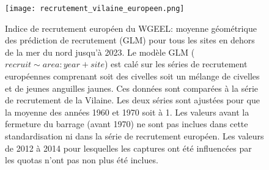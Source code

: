\documentclass[10pt,twocolumn,titlepage,twoside]{article}\usepackage[]{graphicx}\usepackage[]{color}
\begin{document}
\begin{figure}[htpb]
\centering
\texttt{[image: recrutement\_vilaine\_europeen.png]}
\caption{Indice de recrutement européen du WGEEL: moyenne géométrique des
prédiction de recrutement (GLM) pour tous les sites en dehors de la mer du nord
jusqu'à 2023. Le modèle GLM ($recruit \sim area:year+site$) est calé sur
les séries de recrutement européennes comprenant soit des civelles soit un
mélange de civelles et de jeunes anguilles jaunes. Ces données sont comparées à la
  série de recrutement de la Vilaine. Les deux séries sont
  ajustées pour que la moyenne des années 1960 et 1970 soit à 1. Les valeurs avant la fermeture du barrage 
  (avant 1970) ne sont pas inclues dans cette standardisation ni dans la série de
  recrutement européen. Les valeurs de 2012 à 2014 pour lesquelles les captures
  ont été influencées par les quotas n'ont pas non plus été inclues.}
\label{figure_recrutement}
\end{figure}
\clearpage

\clearpage
\end{document}
